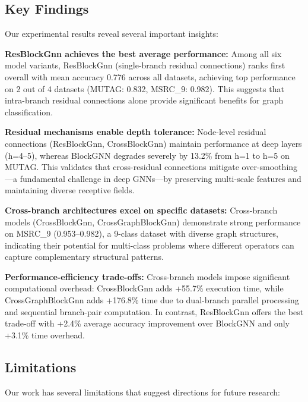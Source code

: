 \subsection{Key Findings}

Our experimental results reveal several important insights:

\textbf{ResBlockGnn achieves the best average performance:} Among all six model variants, ResBlockGnn (single-branch residual connections) ranks first overall with mean accuracy 0.776 across all datasets, achieving top performance on 2 out of 4 datasets (MUTAG: 0.832, MSRC\_9: 0.982). This suggests that intra-branch residual connections alone provide significant benefits for graph classification.

\textbf{Residual mechanisms enable depth tolerance:} Node-level residual connections (ResBlockGnn, CrossBlockGnn) maintain performance at deep layers (h=4--5), whereas BlockGNN degrades severely by 13.2\% from h=1 to h=5 on MUTAG. This validates that cross-residual connections mitigate over-smoothing---a fundamental challenge in deep GNNs---by preserving multi-scale features and maintaining diverse receptive fields.

\textbf{Cross-branch architectures excel on specific datasets:} Cross-branch models (CrossBlockGnn, CrossGraphBlockGnn) demonstrate strong performance on MSRC\_9 (0.953--0.982), a 9-class dataset with diverse graph structures, indicating their potential for multi-class problems where different operators can capture complementary structural patterns.

\textbf{Performance-efficiency trade-offs:} Cross-branch models impose significant computational overhead: CrossBlockGnn adds +55.7\% execution time, while CrossGraphBlockGnn adds +176.8\% time due to dual-branch parallel processing and sequential branch-pair computation. In contrast, ResBlockGnn offers the best trade-off with +2.4\% average accuracy improvement over BlockGNN and only +3.1\% time overhead.

\subsection{Limitations}

Our work has several limitations that suggest directions for future research:

